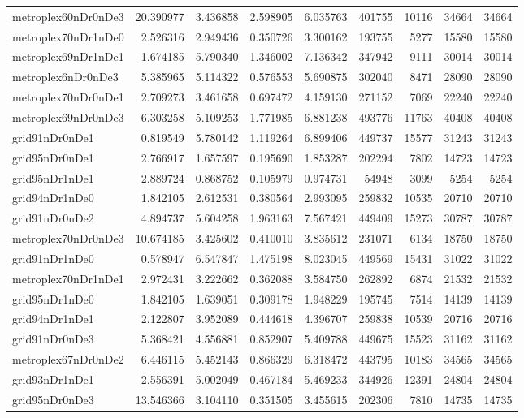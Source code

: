 \begin{longtable}{|l|r|r|r|r|r|r|r|r|}
metroplex60nDr0nDe3 & 20.390977 & 3.436858 & 2.598905 & 6.035763 & 401755 & 10116 & 34664 & 34664 \\
metroplex70nDr1nDe0 & 2.526316 & 2.949436 & 0.350726 & 3.300162 & 193755 & 5277 & 15580 & 15580 \\
metroplex69nDr1nDe1 & 1.674185 & 5.790340 & 1.346002 & 7.136342 & 347942 & 9111 & 30014 & 30014 \\
metroplex6nDr0nDe3 & 5.385965 & 5.114322 & 0.576553 & 5.690875 & 302040 & 8471 & 28090 & 28090 \\
metroplex70nDr0nDe1 & 2.709273 & 3.461658 & 0.697472 & 4.159130 & 271152 & 7069 & 22240 & 22240 \\
metroplex69nDr0nDe3 & 6.303258 & 5.109253 & 1.771985 & 6.881238 & 493776 & 11763 & 40408 & 40408 \\
grid91nDr0nDe1 & 0.819549 & 5.780142 & 1.119264 & 6.899406 & 449737 & 15577 & 31243 & 31243 \\
grid95nDr0nDe1 & 2.766917 & 1.657597 & 0.195690 & 1.853287 & 202294 & 7802 & 14723 & 14723 \\
grid95nDr1nDe1 & 2.889724 & 0.868752 & 0.105979 & 0.974731 & 54948 & 3099 & 5254 & 5254 \\
grid94nDr1nDe0 & 1.842105 & 2.612531 & 0.380564 & 2.993095 & 259832 & 10535 & 20710 & 20710 \\
grid91nDr0nDe2 & 4.894737 & 5.604258 & 1.963163 & 7.567421 & 449409 & 15273 & 30787 & 30787 \\
metroplex70nDr0nDe3 & 10.674185 & 3.425602 & 0.410010 & 3.835612 & 231071 & 6134 & 18750 & 18750 \\
grid91nDr1nDe0 & 0.578947 & 6.547847 & 1.475198 & 8.023045 & 449569 & 15431 & 31022 & 31022 \\
metroplex70nDr1nDe1 & 2.972431 & 3.222662 & 0.362088 & 3.584750 & 262892 & 6874 & 21532 & 21532 \\
grid95nDr1nDe0 & 1.842105 & 1.639051 & 0.309178 & 1.948229 & 195745 & 7514 & 14139 & 14139 \\
grid94nDr1nDe1 & 2.122807 & 3.952089 & 0.444618 & 4.396707 & 259838 & 10539 & 20716 & 20716 \\
grid91nDr0nDe3 & 5.368421 & 4.556881 & 0.852907 & 5.409788 & 449675 & 15523 & 31162 & 31162 \\
metroplex67nDr0nDe2 & 6.446115 & 5.452143 & 0.866329 & 6.318472 & 443795 & 10183 & 34565 & 34565 \\
grid93nDr1nDe1 & 2.556391 & 5.002049 & 0.467184 & 5.469233 & 344926 & 12391 & 24804 & 24804 \\
grid95nDr0nDe3 & 13.546366 & 3.104110 & 0.351505 & 3.455615 & 202306 & 7810 & 14735 & 14735 \\

\end{longtable}
